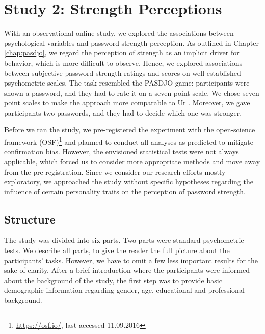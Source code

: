 \section{Study 2: Strength Perceptions}
With an observational online study, we explored the associations between psychological variables and password strength perception. As outlined in Chapter \ref{chap:pasdjo}, we regard the perception of strength as an implicit driver for behavior, which is more difficult to observe. Hence, we explored associations between subjective password strength ratings and scores on well-established psychometric scales. 
The task resembled the PASDJO game: participants were shown a password, and they had to rate it on a seven-point scale. We chose seven point scales to make the approach more comparable to Ur \etal \cite{Ur2016PerceptionsPassword}. Moreover, we gave participants two passwords, and they had to decide which one was stronger. 

Before we ran the study, we pre-registered the experiment with the open-science framework (OSF)\footnote{\url{https://osf.io/}, last accessed 11.09.2016} and planned to conduct all analyses as predicted to mitigate confirmation bias. However, the envisioned statistical  tests were not always applicable, which forced us to consider more appropriate methods and move away from the pre-registration. Since we consider our research efforts mostly exploratory, we approached the study without specific hypotheses regarding the influence of certain personality traits on the perception of password strength.

\subsection{Structure}
The study was divided into six parts. Two parts were standard psychometric tests. We describe all parts, to give the reader the full picture about the participants' tasks. However, we have to omit a few less important results for the sake of clarity. After a brief introduction where the participants were informed about the background of the study, the first step was to provide basic demographic information regarding gender, age, educational and professional background. %

